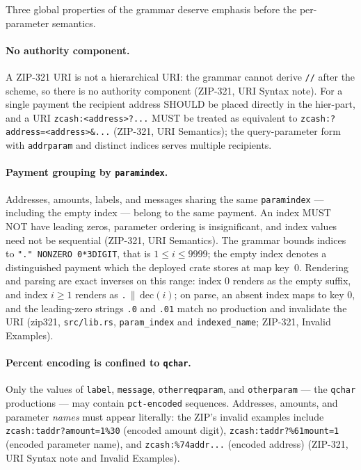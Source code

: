 \documentclass[11pt,a4paper]{article}
\theoremstyle{definition}
\begin{document}
Three global properties of the grammar deserve emphasis before the
per-parameter semantics.

\paragraph{No authority component.} A ZIP-321 URI is not a hierarchical URI:
the grammar cannot derive \texttt{//} after the scheme, so there is no
authority component (ZIP-321, URI Syntax note). For a single payment the
recipient address SHOULD be placed directly in the hier-part, and a URI
\texttt{zcash:<address>?...} MUST be treated as equivalent to
\texttt{zcash:?address=<address>\&...} (ZIP-321, URI Semantics); the
query-parameter form with \texttt{addrparam} and distinct indices serves
multiple recipients.

\paragraph{Payment grouping by \texttt{paramindex}.} Addresses, amounts,
labels, and messages sharing the same \texttt{paramindex} --- including the
empty index --- belong to the same payment. An index MUST NOT have leading
zeros, parameter ordering is insignificant, and index values need not be
sequential (ZIP-321, URI Semantics). The grammar bounds indices to
\texttt{"." NONZERO 0*3DIGIT}, that is $1 \le i \le 9999$; the empty index
denotes a distinguished payment which the deployed crate stores at map
key~$0$. Rendering and parsing are exact inverses on this range: index $0$
renders as the empty suffix, and index $i \ge 1$ renders as
\texttt{.}$\,\|\,\mathrm{dec}(i)$; on parse, an absent index maps to key $0$,
and the leading-zero strings \texttt{.0} and \texttt{.01} match no production
and invalidate the URI (\textsf{zip321}, \texttt{src/lib.rs},
\texttt{param\_index} and \texttt{indexed\_name}; ZIP-321, Invalid Examples).

\paragraph{Percent encoding is confined to \texttt{qchar}.} Only the values
of \texttt{label}, \texttt{message}, \texttt{otherreqparam}, and
\texttt{otherparam} --- the \texttt{qchar} productions --- may contain
\texttt{pct-encoded} sequences. Addresses, amounts, and parameter
\emph{names} must appear literally: the ZIP's invalid examples include
\texttt{zcash:taddr?amount=1\%30} (encoded amount digit),
\texttt{zcash:taddr?\%61mount=1} (encoded parameter name), and
\texttt{zcash:\%74addr...} (encoded address) (ZIP-321, URI Syntax note and
Invalid Examples).
\end{document}
